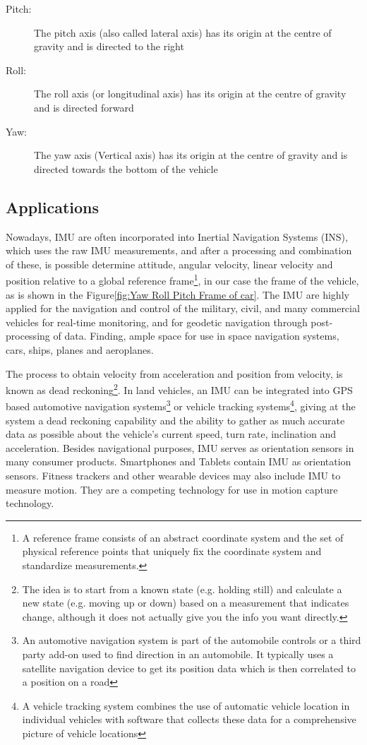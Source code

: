 \documentclass[tesi]{subfiles}
\begin{document}
\begin{description}
\item[Pitch:] The pitch axis (also called lateral axis) has its origin at the centre of gravity and is directed to the right
\item[Roll:] The roll axis (or longitudinal axis) has its origin at the centre of gravity and is directed forward
\item[Yaw:] The yaw axis (Vertical axis) has its origin at the centre of gravity and is directed towards the bottom of the vehicle
\end{description}
\clearpage	
\subsection{Applications}\label{ssc:IMU Uses}
Nowadays, IMU are often incorporated into Inertial Navigation Systems (INS), which uses the raw IMU measurements, and after a processing and combination of these, is possible determine attitude, angular velocity, linear velocity and position relative to a global reference frame\footnote{A reference frame consists of an abstract coordinate system and the set of physical reference points that uniquely fix the coordinate system and standardize measurements.}, in our case the frame of the vehicle, as is shown in the Figure\ref{fig:Yaw Roll Pitch Frame of car}. 
The IMU are highly applied for the navigation and control of the military, civil, and many commercial vehicles for real-time monitoring, and for geodetic navigation through post-processing of data.
Finding, ample space for use in space navigation systems, cars, ships, planes and aeroplanes.

The process to obtain velocity from acceleration and position from velocity, is known as dead reckoning\footnote{The idea is to start from a known state (e.g. holding still) and calculate a new state (e.g. moving up or down) based on a measurement that indicates change, although it does not actually give you the info you want directly.}.
In land vehicles, an IMU can be integrated into GPS based automotive navigation systems\footnote{An automotive navigation system is part of the automobile controls or a third party add-on used to find direction in an automobile. It typically uses a satellite navigation device to get its position data which is then correlated to a position on a road} or vehicle tracking systems\footnote{A vehicle tracking system combines the use of automatic vehicle location in individual vehicles with software that collects these data for a comprehensive picture of vehicle locations}, giving at the system a dead reckoning capability and the ability to gather as much accurate data as possible about the vehicle's current speed, turn rate, inclination and acceleration. 
Besides navigational purposes, IMU serves as orientation sensors in many consumer products. Smartphones and Tablets contain IMU as orientation sensors. Fitness trackers and other wearable devices may also include IMU to measure motion.  They are a competing technology for use in motion capture technology\cite{motioncapture}.
\clearpage
\end{document}
